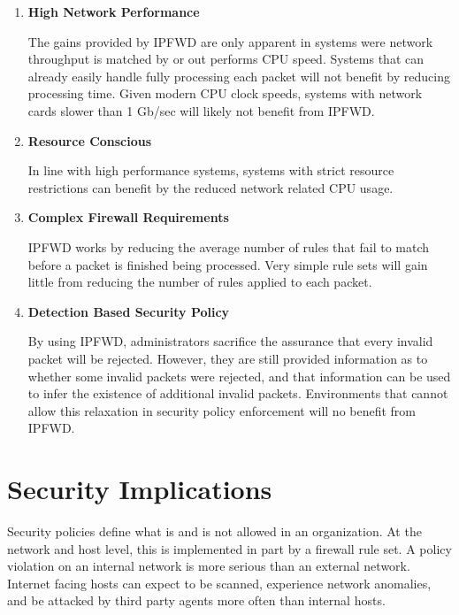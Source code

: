 \documentclass[journal]{IEEEtran}
\begin{document}
    \begin{enumerate}
      \item \textbf{High Network Performance}

        The gains provided by IPFWD are only apparent in systems were network
        throughput is matched by or out performs CPU speed. Systems that can
        already easily handle fully processing each packet will not benefit by
        reducing processing time. Given modern CPU clock speeds, systems with
        network cards slower than 1 Gb/sec will likely not benefit from IPFWD.

      \item \textbf{Resource Conscious}

        In line with high performance systems, systems with strict resource
        restrictions can benefit by the reduced network related CPU usage.

      \item \textbf{Complex Firewall Requirements}

        IPFWD works by reducing the average number of rules that fail to match
        before a packet is finished being processed. Very simple rule sets will
        gain little from reducing the number of rules applied to each packet.

      \item \textbf{Detection Based Security Policy}

        By using IPFWD, administrators sacrifice the assurance that every
        invalid packet will be rejected.  However, they are still provided
        information as to whether some invalid packets were rejected, and that
        information can be used to infer the existence of additional invalid
        packets. Environments that cannot allow this relaxation in security
        policy enforcement will no benefit from IPFWD.

    \end{enumerate}


\section{Security Implications}

  Security policies define what is and is not allowed in an organization. At
  the network and host level, this is implemented in part by a firewall rule
  set. A policy violation on an internal network is more serious than an
  external network. Internet facing hosts can expect to be scanned, experience
  network anomalies, and be attacked by third party agents more often than
  internal hosts. 
\end{document}
